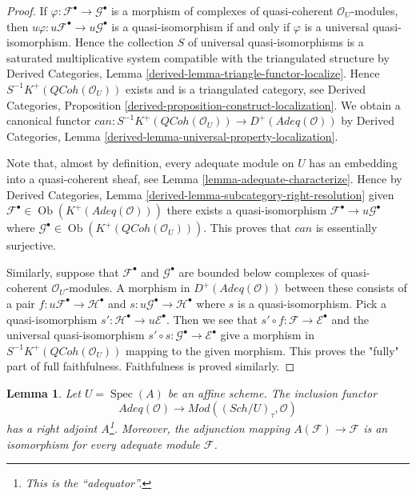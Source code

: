 \documentclass{stacks-project}
\theoremstyle{plain}
\newtheorem{lemma}[subsection]{Lemma}
\theoremstyle{definition}
\theoremstyle{remark}
\numberwithin{equation}{subsection}
\def\Spec{\mathop{\mathrm{Spec}}}
\def\Sch{\mathit{Sch}}
\def\Ob{\mathop{\mathrm{Ob}}\nolimits}
\def\QCoh{\mathit{QCoh}}
\begin{document}
\begin{proof}
If $\varphi : \mathcal{F}^\bullet \to \mathcal{G}^\bullet$
is a morphism of complexes of quasi-coherent
$\mathcal{O}_U$-modules, then $u\varphi : u\mathcal{F}^\bullet \to
u\mathcal{G}^\bullet$ is a quasi-isomorphism if and only if $\varphi$ is
a universal quasi-isomorphism. Hence the collection $S$
of universal quasi-isomorphisms is a saturated multiplicative
system compatible with the triangulated structure by
Derived Categories, Lemma \ref{derived-lemma-triangle-functor-localize}.
Hence $S^{-1}K^+(\QCoh(\mathcal{O}_U))$ exists and is a
triangulated category, see
Derived Categories, Proposition
\ref{derived-proposition-construct-localization}.
We obtain a canonical functor
$can : S^{-1}K^+(\QCoh(\mathcal{O}_U)) \to
D^{+}(\textit{Adeq}(\mathcal{O}))$ by
Derived Categories, Lemma \ref{derived-lemma-universal-property-localization}.

\medskip\noindent
Note that, almost by definition, every adequate module on $U$ has an
embedding into a quasi-coherent sheaf, see
Lemma \ref{lemma-adequate-characterize}. Hence by
Derived Categories, Lemma \ref{derived-lemma-subcategory-right-resolution}
given $\mathcal{F}^\bullet \in \Ob(K^+(\textit{Adeq}(\mathcal{O})))$
there exists a quasi-isomorphism
$\mathcal{F}^\bullet \to u\mathcal{G}^\bullet$
where $\mathcal{G}^\bullet \in \Ob(K^+(\QCoh(\mathcal{O}_U)))$.
This proves that $can$ is essentially surjective.

\medskip\noindent
Similarly, suppose that $\mathcal{F}^\bullet$ and $\mathcal{G}^\bullet$
are bounded below complexes of quasi-coherent $\mathcal{O}_U$-modules.
A morphism in $D^+(\textit{Adeq}(\mathcal{O}))$ between these
consists of a pair $f : u\mathcal{F}^\bullet \to \mathcal{H}^\bullet$
and $s : u\mathcal{G}^\bullet \to \mathcal{H}^\bullet$ where $s$
is a quasi-isomorphism. Pick a quasi-isomorphism
$s' : \mathcal{H}^\bullet \to u\mathcal{E}^\bullet$. Then we see that
$s' \circ f : \mathcal{F} \to \mathcal{E}^\bullet$ and the
universal quasi-isomorphism
$s' \circ s : \mathcal{G}^\bullet \to \mathcal{E}^\bullet$ give
a morphism in $S^{-1}K^{+}(\QCoh(\mathcal{O}_U))$ mapping
to the given morphism. This proves the "fully" part of full faithfulness.
Faithfulness is proved similarly.
\end{proof}

\begin{lemma}
\label{lemma-right-adjoint-adequate}
Let $U = \Spec(A)$ be an affine scheme.
The inclusion functor
$$
\textit{Adeq}(\mathcal{O}) \to
\textit{Mod}((\Sch/U)_\tau, \mathcal{O})
$$
has a right adjoint $A$\footnote{This is the ``adequator''.}.
Moreover, the adjunction mapping
$A(\mathcal{F}) \to \mathcal{F}$ is an isomorphism for every
adequate module $\mathcal{F}$.
\end{lemma}
\end{document}
